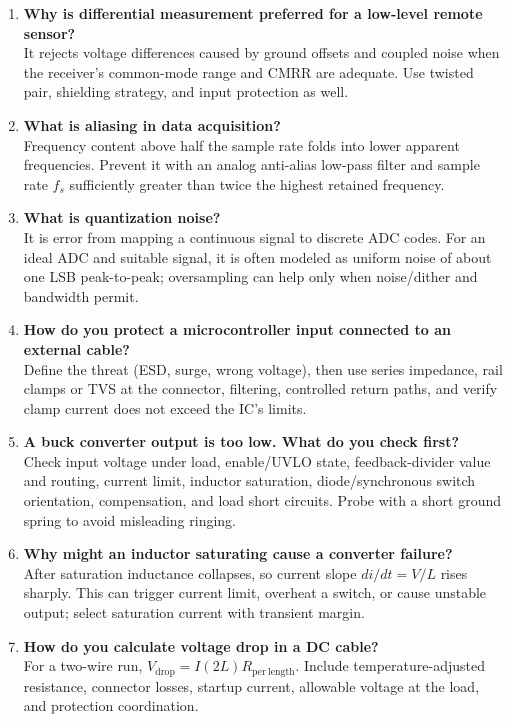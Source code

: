 \documentclass[11pt]{article}
\begin{document}
\begin{enumerate}
\item \textbf{Why is differential measurement preferred for a low-level remote sensor?}\\
It rejects voltage differences caused by ground offsets and coupled noise when the receiver's common-mode range and CMRR are adequate. Use twisted pair, shielding strategy, and input protection as well.

\item \textbf{What is aliasing in data acquisition?}\\
Frequency content above half the sample rate folds into lower apparent frequencies. Prevent it with an analog anti-alias low-pass filter and sample rate $f_s$ sufficiently greater than twice the highest retained frequency.

\item \textbf{What is quantization noise?}\\
It is error from mapping a continuous signal to discrete ADC codes. For an ideal ADC and suitable signal, it is often modeled as uniform noise of about one LSB peak-to-peak; oversampling can help only when noise/dither and bandwidth permit.

\item \textbf{How do you protect a microcontroller input connected to an external cable?}\\
Define the threat (ESD, surge, wrong voltage), then use series impedance, rail clamps or TVS at the connector, filtering, controlled return paths, and verify clamp current does not exceed the IC's limits.

\item \textbf{A buck converter output is too low. What do you check first?}\\
Check input voltage under load, enable/UVLO state, feedback-divider value and routing, current limit, inductor saturation, diode/synchronous switch orientation, compensation, and load short circuits. Probe with a short ground spring to avoid misleading ringing.

\item \textbf{Why might an inductor saturating cause a converter failure?}\\
After saturation inductance collapses, so current slope $di/dt=V/L$ rises sharply. This can trigger current limit, overheat a switch, or cause unstable output; select saturation current with transient margin.

\item \textbf{How do you calculate voltage drop in a DC cable?}\\
For a two-wire run, $V_\mathrm{drop}=I(2L)R_\mathrm{per\ length}$. Include temperature-adjusted resistance, connector losses, startup current, allowable voltage at the load, and protection coordination.


\end{enumerate}
\end{document}
